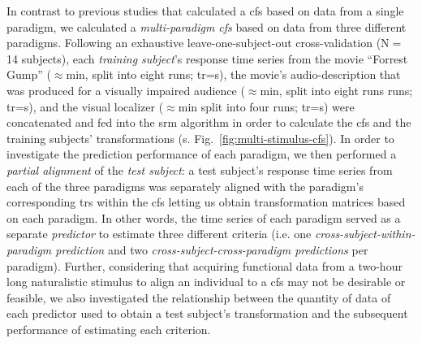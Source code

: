 In contrast to previous studies \citep{jiahui2020predicting,
guntupalli2016model, haxby2011common} that calculated a \ac{cfs} based on data
from a single paradigm, we calculated a \textit{multi-paradigm \ac{cfs}} based
on data from three different paradigms.
Following an exhaustive leave-one-subject-out cross-validation (N$=$14
subjects), each \textit{training subject}'s response time series from
%
the movie ``Forrest Gump'' ($\approx$\unit[120]{min}, split into eight runs;
\ac{tr}=\unit[2]{s}),
%
the movie's audio-description that was produced for a visually impaired audience
($\approx$\unit[120]{min}, split into eight runs runs; \ac{tr}=\unit[2]{s}), and
%
the visual localizer ($\approx$\unit[20]{min} split into four runs;
\ac{tr}=\unit[2]{s})
%
were concatenated and fed into the \ac{srm} algorithm in order to calculate the
\ac{cfs} and the training subjects' transformations (s.
Fig.~\ref{fig:multi-stimulus-cfs}).
In order to investigate the prediction performance of each paradigm, we then
performed a \textit{partial alignment} of the \textit{test subject}:
%
a test subject's response time series from each of the three paradigms was
separately aligned with the paradigm's corresponding \acp{tr} within the
\ac{cfs} letting us obtain transformation matrices based on each paradigm.
%
In other words, the time series of each paradigm served as a separate
\textit{predictor} to estimate three different criteria (i.e. one
\textit{cross-subject-within-paradigm prediction} and two
\textit{cross-subject-cross-paradigm predictions} per paradigm).
%
Further, considering that acquiring functional data from a two-hour long
naturalistic stimulus to align an individual to a \ac{cfs} may not be desirable
or feasible, we also investigated the relationship between the quantity of data
of each predictor used to obtain a test subject's transformation and the
subsequent performance of estimating each criterion.





